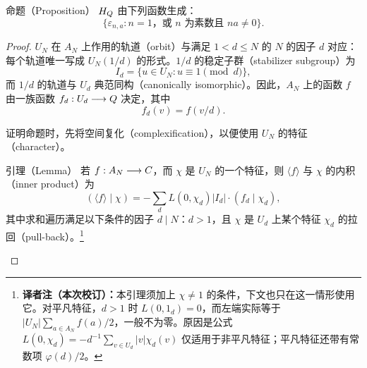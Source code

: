 \begin{originaltheorem}{命题（Proposition）}
$H_{Q}$ 由下列函数生成：
\[
 \{\varepsilon_{n,a}:n=1\text{，或 }n\text{ 为素数且 }na\ne0\}.
\]
\end{originaltheorem}
\begin{proof}
$U_N$ 在 $A_N$ 上作用的轨道（orbit）与满足 $1<d\leq N$ 的 $N$ 的因子 $d$ 对应：每个轨道唯一写成 $U_N(1/d)$ 的形式。$1/d$ 的稳定子群（stabilizer subgroup）为
\[
 I_d=\{u\in U_N:u\equiv1\pmod d\},
\]
而 $1/d$ 的轨道与 $U_d$ 典范同构（canonically isomorphic）。因此，$A_N$ 上的函数 $f$ 由一族函数 $f_d:U_d\longrightarrow Q$ 决定，其中
\[
 f_d(v)=f(v/d).
\]

证明命题时，先将空间复化（complexification），以便使用 $U_N$ 的特征（character）。

\begin{originaltheorem}{引理（Lemma）}
若 $f:A_N\longrightarrow C$，而 $\chi$ 是 $U_N$ 的一个特征，则 $\langle f\rangle$ 与 $\chi$ 的内积（inner product）为
\[
 (\langle f\rangle\mid\chi)
 =-\sum_d L(0,\chi_d)|I_d|\cdot(f_d\mid\chi_d),
\]
其中求和遍历满足以下条件的因子 $d\mid N$：$d>1$，且 $\chi$ 是 $U_d$ 上某个特征 $\chi_d$ 的拉回（pull-back）。\footnote{\textbf{译者注（本次校订）：}本引理须加上 $\chi\ne1$ 的条件，下文也只在这一情形使用它。对平凡特征，$d>1$ 时 $L(0,1_d)=0$，而左端实际等于 $|U_N|\sum_{a\in A_N}f(a)/2$，一般不为零。原因是公式 $L(0,\chi_d)=-d^{-1}\sum_{v\in U_d}|v|\chi_d(v)$ 仅适用于非平凡特征；平凡特征还带有常数项 $\varphi(d)/2$。}
\end{originaltheorem}


\end{proof}
